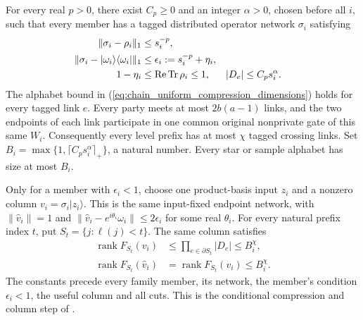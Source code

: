 \begin{lemma}
    For every real $p>0$, there exist $C_p\ge0$ and an integer $\alpha>0$,
    chosen before all $i$, such that every member has a tagged
    distributed operator network $\sigma_i$ satisfying
    \begin{align}
        \|\sigma_i-\rho_i\|_1 & \le s_i^{-p},\notag                                \\
        \|\sigma_i-|\omega_i\rangle\langle\omega_i|\|_1
                              & \le\epsilon_i:=s_i^{-p}+\eta_i,
        \label{eq:chain_uniform_compression_error}                                 \\
        1-\eta_i              & \le\operatorname{Re}\operatorname{Tr}\rho_i\le1, &
        |D_e|                 & \le C_ps_i^\alpha.
        \label{eq:chain_uniform_compression_dimensions}
    \end{align}
    The alphabet bound in (\ref{eq:chain_uniform_compression_dimensions})
    holds for every tagged link $e$.
    Every party meets at most $2b(a-1)$ links, and the two endpoints
    of each link participate in one common original nonprivate gate
    of this same $W_i$. Consequently every level prefix has at most
    $\chi$ tagged crossing links.
    Set $B_i=\max\{1,\lceil C_ps_i^\alpha\rceil_+\}$, a natural number.
    Every star or sample alphabet has size at most $B_i$.

    Only for a member with $\epsilon_i<1$, choose one product-basis
    input $z_i$ and a nonzero column $v_i=\sigma_i|z_i\rangle$.
    This is the same input-fixed endpoint network, with
    $\|\widehat v_i\|=1$ and
    $\|\widehat v_i-e^{i\theta_i}\omega_i\|\le2\epsilon_i$ for some real
    $\theta_i$. For every natural prefix index $t$, put
    $S_t=\{j:\ell(j)<t\}$. The same column satisfies
    \begin{align}
        \operatorname{rank}F_{S_t}(v_i)
         & \le\prod_{e\in\partial S_t}|D_e|\le B_i^{\chi},
        \label{eq:chain_uniform_column_rank}               \\
        \operatorname{rank}F_{S_t}(\widehat v_i)
         & =\operatorname{rank}F_{S_t}(v_i)\le B_i^{\chi}.
        \label{eq:chain_uniform_normalized_rank}
    \end{align}
    The constants precede every family member, its network, the
    member's condition $\epsilon_i<1$, the useful column and all cuts.
    This is the conditional compression and column step of
    \cite[Theorem~5.2, Remark~5.3 and Lemma~8.1]{OpenAI2026PolynomialPEPS}.
    
\end{lemma}
